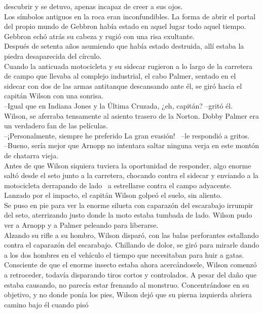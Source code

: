 descubrir y se detuvo, apenas incapaz de creer a sus ojos.\\
Los símbolos antiguos en la roca eran inconfundibles. La forma de abrir
el portal del propio mundo de Gebbron había estado en aquel lugar todo
aquel tiempo. Gebbron echó atrás su cabeza y rugió con una risa
exultante.\\
Después de setenta años asumiendo que había estado destruida, allí
estaba la piedra desaparecida del círculo.\\[2\baselineskip]Cuando la
anticuada motocicleta y su sidecar rugieron a lo largo de la carretera
de campo que llevaba al complejo industrial, el cabo Palmer, sentado en
el sidecar con dos de las armas antitanque descansando ante él, se giró
hacia el capitán Wilson con una sonrisa.\\
--Igual que en Indiana Jones y la Última Cruzada, ¿eh, capitán? --gritó
él.\\
Wilson, se aferraba tensamente al asiento trasero de la Norton. Dobby
Palmer era un verdadero fan de las películas.\\
--¡Personalmente, siempre he preferido La gran evasión! ~--le respondió
a gritos.\\
--Bueno, sería mejor que Arnopp no intentara saltar ninguna verja en
este montón de chatarra vieja.\\
Antes de que Wilson siquiera tuviera la oportunidad de responder, algo
enorme saltó desde el seto junto a la carretera, chocando contra el
sidecar y enviando a la motocicleta derrapando de lado ~a estrellarse
contra el campo adyacente. Lanzado por el impacto, el capitán Wilson
golpeó el suelo, sin aliento.\\
Se puso en pie para ver la enorme silueta con caparazón del escarabajo
irrumpir del seto, aterrizando justo donde la moto estaba tumbada de
lado. Wilson pudo ver a Arnopp y a Palmer peleando para liberarse.\\
Alzando su rifle a su hombro, Wilson disparó, con las balas perforantes
estallando contra el caparazón del escarabajo. Chillando de dolor, se
giró para mirarle dando a los dos hombres en el vehículo el tiempo que
necesitaban para huir a gatas.\\
Consciente de que el enorme insecto estaba ahora acercándosele, Wilson
comenzó a retroceder, todavía disparando tiros cortos y controlados. A
pesar del daño que estaba causando, no parecía estar frenando al
monstruo. Concentrándose en su objetivo, y no donde ponía los pies,
Wilson dejó que su pierna izquierda abriera camino bajo él cuando pisó
